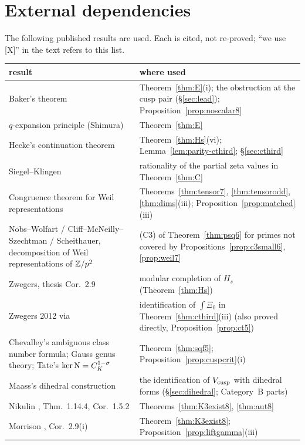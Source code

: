 \section{External dependencies}\label{sec:deps}
The following published results are used. Each is cited, not re-proved; ``we use [X]'' in the text refers to this list.
\begin{center}\small
\begin{longtable}{p{5.2cm}p{9.4cm}}\toprule
result & where used\\\midrule\endhead
Baker's theorem \cite{Baker} & Theorem~\ref{thm:E}(i); the obstruction at the cusp pair (\S\ref{sec:lead}); Proposition~\ref{prop:noscalar8}\\
$q$-expansion principle (Shimura) & Theorem~\ref{thm:E}\\
Hecke's continuation theorem \cite{Hecke} & Theorem~\ref{thm:Hs}(vi); Lemma~\ref{lem:parity-cthird}; \S\ref{sec:cthird}\\
Siegel--Klingen \cite{SiegelKlingen} & rationality of the partial zeta values in Theorem~\ref{thm:C}\\
Congruence theorem for Weil representations \cite{Weil} & Theorems~\ref{thm:tensor7}, \ref{thm:tensorodd}, \ref{thm:dims}(iii); Proposition~\ref{prop:matched}(iii)\\
Nobs--Wolfart / Cliff--McNeilly--Szechtman / Scheithauer, decomposition of Weil representations of $\mathbb{Z}/p^2$ & (C3) of Theorem~\ref{thm:psq6} for primes not covered by Propositions~\ref{prop:c3small6}, \ref{prop:weil7}\\
Zwegers, thesis Cor.~2.9 \cite{Zw} & modular completion of $H_s$ (Theorem~\ref{thm:Hs})\\
Zwegers 2012 \cite{Zw12} via \cite{BCN} & identification of $\int\Xi_0$ in Theorem~\ref{thm:cthird}(iii) (also proved directly, Proposition~\ref{prop:ct5})\\
Chevalley's ambiguous class number formula; Gauss genus theory; Tate's $\ker\mathrm{N}=C_K^{1-\sigma}$ & Theorem~\ref{thm:sqf5}; Proposition~\ref{prop:cuspcrit}(i)\\
Maass's dihedral construction \cite{Maass} & the identification of $V_{\rm cusp}$ with dihedral forms (\S\ref{sec:dihedral}; Category~B parts)\\
Nikulin \cite{Nikulin}, Thm.~1.14.4, Cor.~1.5.2 & Theorems~\ref{thm:K3exist8}, \ref{thm:aut8}\\
Morrison \cite{Morrison}, Cor.~2.9(i) & Theorem~\ref{thm:K3exist8}; Proposition~\ref{prop:liftgamma}(iii)\\

\end{longtable}
\end{center}
